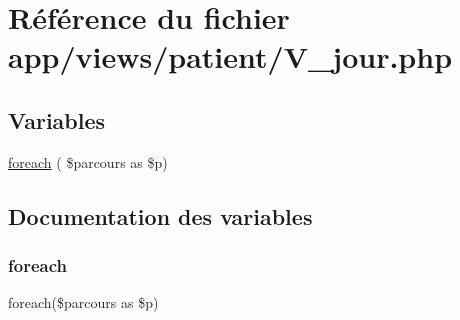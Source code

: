 \hypertarget{_v__jour_8php}{}\section{Référence du fichier app/views/patient/\+V\+\_\+jour.php}
\label{_v__jour_8php}
\subsection*{Variables}
\begin{DoxyCompactItemize}
\item 
\hyperlink{_v__jour_8php_a31267ffd9f0930bf81bd5c0929e16353}{foreach} ( \$parcours as \$p)
\end{DoxyCompactItemize}


\subsection{Documentation des variables}
\mbox{\label{_v__jour_8php_a31267ffd9f0930bf81bd5c0929e16353}} 
\subsubsection{\texorpdfstring{foreach}{foreach}}
{\footnotesize\ttfamily foreach(\$parcours as \$p)}

